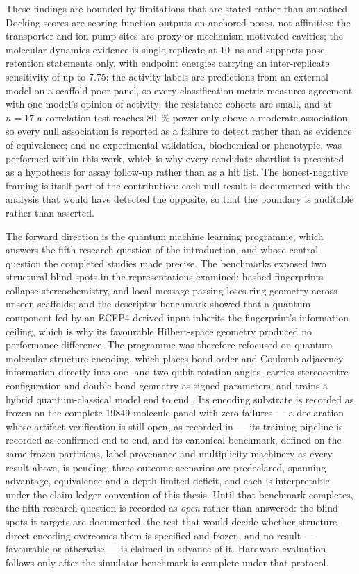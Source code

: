 These findings are bounded by limitations that are stated rather than smoothed. Docking scores are scoring-function outputs on anchored poses, not affinities; the transporter and ion-pump sites are proxy or mechanism-motivated cavities; the molecular-dynamics evidence is single-replicate at \qty{10}{\ns} and supports pose-retention statements only, with endpoint energies carrying an inter-replicate sensitivity of up to \qty{7.75}{\kcalmol}; the activity labels are predictions from an external model on a scaffold-poor panel, so every classification metric measures agreement with one model's opinion of activity; the resistance cohorts are small, and at $n = \num{17}$ a correlation test reaches \qty{80}{\percent} power only above a moderate association, so every null association is reported as a failure to detect rather than as evidence of equivalence; and no experimental validation, biochemical or phenotypic, was performed within this work, which is why every candidate shortlist is presented as a hypothesis for assay follow-up rather than as a hit list. The honest-negative framing is itself part of the contribution: each null result is documented with the analysis that would have detected the opposite, so that the boundary is auditable rather than asserted.

The forward direction is the quantum machine learning programme, which answers the fifth research question of the introduction, and whose central question the completed studies made precise. The benchmarks exposed two structural blind spots in the representations examined: hashed fingerprints collapse stereochemistry, and local message passing loses ring geometry across unseen scaffolds; and the descriptor benchmark showed that a quantum component fed by an ECFP4-derived input inherits the fingerprint's information ceiling, which is why its favourable Hilbert-space geometry produced no performance difference. The programme was therefore refocused on quantum molecular structure encoding, which places bond-order and Coulomb-adjacency information directly into one- and two-qubit rotation angles, carries stereocentre configuration and double-bond geometry as signed parameters, and trains a hybrid quantum-classical model end to end \cite{Boy2025QMSE}. Its encoding substrate is recorded as frozen on the complete \num{19849}-molecule panel with zero failures --- a declaration whose artifact verification is still open, as recorded in  --- its training pipeline is recorded as confirmed end to end, and its canonical benchmark, defined on the same frozen partitions, label provenance and multiplicity machinery as every result above, is pending; three outcome scenarios are predeclared, spanning advantage, equivalence and a depth-limited deficit, and each is interpretable under the claim-ledger convention of this thesis. Until that benchmark completes, the fifth research question is recorded as \emph{open} rather than answered: the blind spots it targets are documented, the test that would decide whether structure-direct encoding overcomes them is specified and frozen, and no result — favourable or otherwise — is claimed in advance of it. Hardware evaluation follows only after the simulator benchmark is complete under that protocol.

